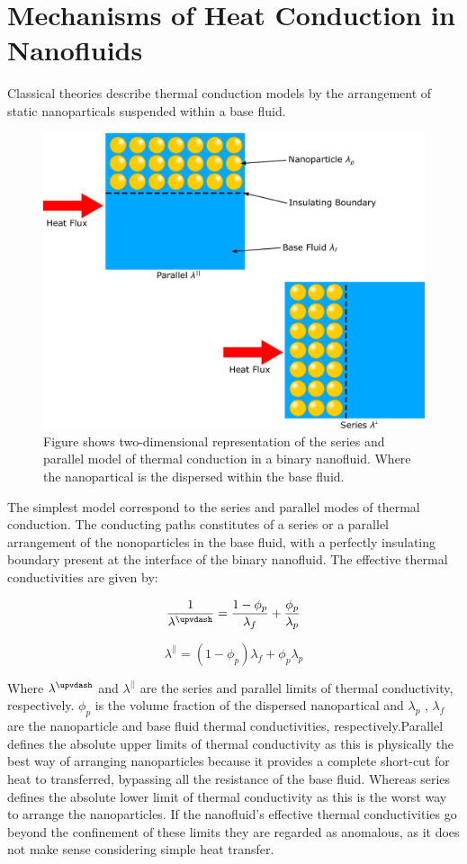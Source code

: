 \documentclass[12pt,MEng]{UoAThesis}
\begin{document}
\section{Mechanisms of Heat Conduction in Nanofluids}
Classical theories describe thermal conduction models by the arrangement of static nanoparticals suspended within a base fluid.

\begin{figure}[htp]
  \centering
  \includegraphics[clip,width=0.8\linewidth]{figures/seriesparralel}
  \caption{\label{fig:sp} Figure shows two-dimensional representation of the series and parallel model of thermal conduction in a binary nanofluid. Where the nanopartical is the dispersed within the base fluid. }
\end{figure}

The simplest model correspond to the series and parallel modes of thermal conduction. The conducting paths constitutes of a series or a parallel arrangement of the nonoparticles in the base fluid, with a perfectly insulating boundary present at the interface of the binary nanofluid. The effective thermal conductivities are given by:

\begin{equation}
 \frac{1}{\lambda^{\upvdash}}
 = \frac{1-\phi_p}{\lambda_f} + \frac{\phi_p}{\lambda_p}
\end{equation}

\begin{equation}
\lambda^{||} = ( 1-\phi_p ) \lambda_f + \phi_p \lambda_p
\end{equation}

\noindent Where $\lambda^{\upvdash}$ and $\lambda^{||}$ are the series and parallel limits of thermal conductivity, respectively. $\phi_p$ is the volume fraction of the dispersed nanopartical and $\lambda_p$ , $\lambda_f$ are the nanoparticle and base fluid thermal conductivities, respectively.Parallel defines the absolute upper limits of thermal conductivity as this is physically the best way of arranging nanoparticles because it provides a complete short-cut for heat to transferred, bypassing all the resistance of the base fluid. Whereas series defines the absolute lower limit of thermal conductivity as this is the worst way to arrange the nanoparticles. If the nanofluid's effective thermal conductivities go beyond the confinement of these limits they are regarded as anomalous, as it does not make sense considering simple heat transfer. 
\end{document}
